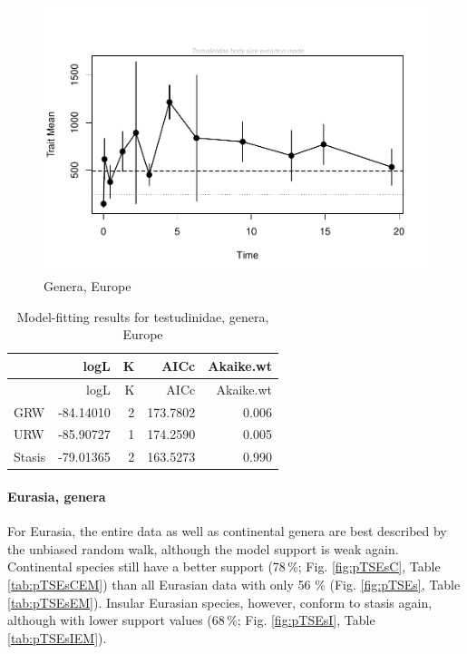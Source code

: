 \begin{figure}[H]
	\centering
	\includegraphics{MA_JJ_files/figure-latex/paleoTSEurope-1.pdf}
	\caption{Genera, Europe}
	\label{fig:pTSEu}
\end{figure}

\begin{longtable}[]{@{}lrrrr@{}}
	\caption{Model-fitting results for testudinidae, genera,
		Europe}
	\label{tab:pTSEuEM}\tabularnewline
	\toprule
	& logL & K & AICc & Akaike.wt\tabularnewline
	\midrule
	\endfirsthead
	\toprule
	& logL & K & AICc & Akaike.wt\tabularnewline
	\midrule
	\endhead
	GRW & -84.14010 & 2 & 173.7802 & 0.006\tabularnewline
	URW & -85.90727 & 1 & 174.2590 & 0.005\tabularnewline
	Stasis & -79.01365 & 2 & 163.5273 & 0.990\tabularnewline
	\bottomrule
\end{longtable}

\FloatBarrier



\paragraph{Eurasia,	genera}\label{eurasia-genera}


For Eurasia, the entire data as well as continental genera are best described by the unbiased random walk, although the model support is weak again. Continental species still have a better support (78\,\%; Fig. \ref{fig:pTSEsC}, Table \ref{tab:pTSEsCEM}) than all Eurasian data with only 56 \% (Fig. \ref{fig:pTSEs}, Table \ref{tab:pTSEsEM}). Insular Eurasian species, however, conform to stasis again, although with lower support values (68\,\%; Fig. \ref{fig:pTSEsI}, Table \ref{tab:pTSEsIEM}).



